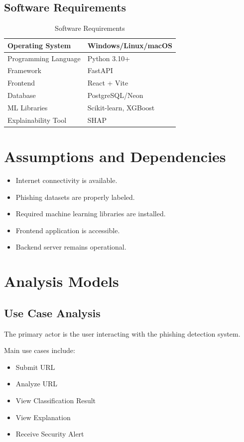 \documentclass[12pt]{report}
\begin{document}
\subsection{Software Requirements}

\begin{table}[H]
\centering
\caption{Software Requirements}
\begin{tabular}{|l|l|}
\hline
Operating System & Windows/Linux/macOS \\
\hline
Programming Language & Python 3.10+ \\
\hline
Framework & FastAPI \\
\hline
Frontend & React + Vite \\
\hline
Database & PostgreSQL/Neon \\
\hline
ML Libraries & Scikit-learn, XGBoost \\
\hline
Explainability Tool & SHAP \\
\hline
\end{tabular}
\end{table}

\section{Assumptions and Dependencies}

\begin{itemize}
    \item Internet connectivity is available.
    \item Phishing datasets are properly labeled.
    \item Required machine learning libraries are installed.
    \item Frontend application is accessible.
    \item Backend server remains operational.
\end{itemize}

\section{Analysis Models}

\subsection{Use Case Analysis}

The primary actor is the user interacting with the phishing detection system.

Main use cases include:

\begin{itemize}
    \item Submit URL
    \item Analyze URL
    \item View Classification Result
    \item View Explanation
    \item Receive Security Alert
\end{itemize}
\end{document}
